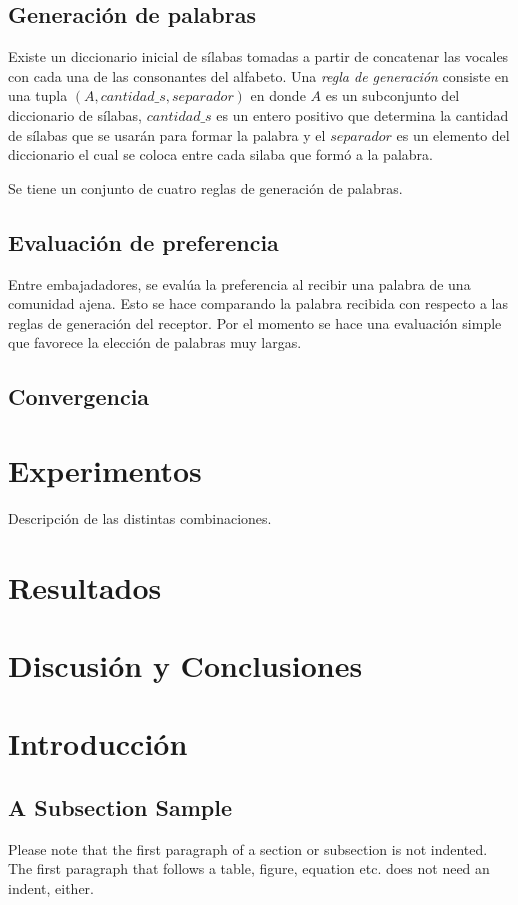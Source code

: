 \documentclass[runningheads]{llncs}
\begin{document}
\subsection{Generación de palabras}
Existe un diccionario inicial de sílabas tomadas a partir de concatenar las vocales con cada una de las consonantes del alfabeto. Una \textit{regla de generación} consiste en una tupla $(A,cantidad\_s,separador)$ en donde $A$ es un subconjunto del diccionario de sílabas, $cantidad\_s$ es un entero positivo que determina la cantidad de sílabas que se usarán para formar la palabra y el $separador$ es un elemento del diccionario el cual se coloca entre cada silaba que formó a la palabra.

Se tiene un conjunto de cuatro reglas de generación de palabras. 


\subsection{Evaluación de preferencia}

Entre embajadadores, se evalúa la preferencia al recibir una palabra de una comunidad ajena. Esto se hace comparando la palabra recibida con respecto a las reglas de generación del receptor. Por el momento se hace una evaluación simple que favorece la elección de palabras muy largas.
\subsection{Convergencia}


\section{Experimentos}


Descripción de las distintas combinaciones.
\section{Resultados}
\section{Discusión y Conclusiones}
\section{Introducción}
\subsection{A Subsection Sample}Please note that the first paragraph of a section or subsection is
not indented. The first paragraph that follows a table, figure,
equation etc. does not need an indent, either.
\end{document}
